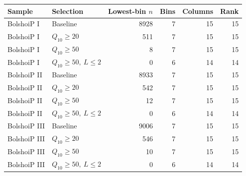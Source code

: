 \begin{tabular}{llrrrr}
\toprule
Sample & Selection & Lowest-bin $n$ & Bins & Columns & Rank \\
\midrule
BolshoiP I & Baseline & 8928 & 7 & 15 & 15 \\
BolshoiP I & $Q_{10}\geq20$ & 511 & 7 & 15 & 15 \\
BolshoiP I & $Q_{10}\geq50$ & 8 & 7 & 15 & 15 \\
BolshoiP I & $Q_{10}\geq50,\ L\leq2$ & 0 & 6 & 14 & 14 \\
BolshoiP II & Baseline & 8933 & 7 & 15 & 15 \\
BolshoiP II & $Q_{10}\geq20$ & 542 & 7 & 15 & 15 \\
BolshoiP II & $Q_{10}\geq50$ & 12 & 7 & 15 & 15 \\
BolshoiP II & $Q_{10}\geq50,\ L\leq2$ & 0 & 6 & 14 & 14 \\
BolshoiP III & Baseline & 9006 & 7 & 15 & 15 \\
BolshoiP III & $Q_{10}\geq20$ & 546 & 7 & 15 & 15 \\
BolshoiP III & $Q_{10}\geq50$ & 10 & 7 & 15 & 15 \\
BolshoiP III & $Q_{10}\geq50,\ L\leq2$ & 0 & 6 & 14 & 14 \\
\bottomrule
\end{tabular}
